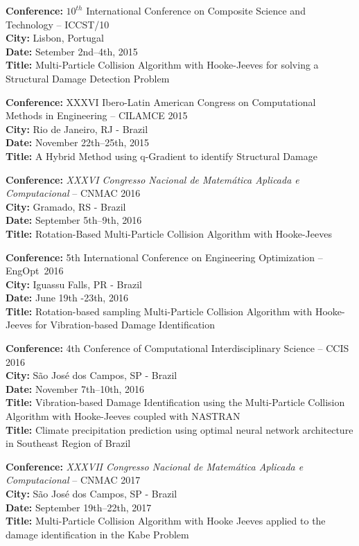 \textbf{Conference:} $10^{th}$ International Conference on Composite Science and Technology -- ICCST/10 \\
\textbf{City:} Lisbon, Portugal \\
\textbf{Date:} Setember 2nd--4th, 2015 \\
\textbf{Title:} Multi-Particle Collision Algorithm with Hooke-Jeeves for solving a Structural Damage Detection Problem

\textbf{Conference:}  XXXVI Ibero-Latin American Congress on Computational Methods in Engineering -- CILAMCE 2015 \\
\textbf{City:} Rio de Janeiro, RJ - Brazil \\
\textbf{Date:} November 22th--25th, 2015 \\
\textbf{Title:} A Hybrid Method using q-Gradient to identify Structural Damage

\textbf{Conference:} \textit{XXXVI Congresso Nacional de Matem\'atica Aplicada e Computacional} -- CNMAC 2016 \\
\textbf{City:} Gramado, RS - Brazil \\
\textbf{Date:} September 5th--9th, 2016 \\
\textbf{Title:} Rotation-Based Multi-Particle Collision Algorithm with Hooke-Jeeves

\textbf{Conference:} 5th International Conference on Engineering Optimization -- \mbox{EngOpt 2016} \\
\textbf{City:} Iguassu Falls, PR - Brazil \\
\textbf{Date:} June 19th -23th, 2016 \\
\textbf{Title:} Rotation-based sampling Multi-Particle Collision Algorithm with Hooke-Jeeves for Vibration-based Damage Identification

\textbf{Conference:} 4th Conference of Computational Interdisciplinary Science -- CCIS 2016 \\
\textbf{City:} São José dos Campos, SP - Brazil \\
\textbf{Date:} November 7th--10th, 2016 \\
\textbf{Title:} Vibration-based Damage Identification using the Multi-Particle Collision Algorithm with Hooke-Jeeves coupled with NASTRAN \\
\textbf{Title:} Climate precipitation prediction using optimal neural network architecture in Southeast Region of Brazil

\textbf{Conference:} \textit{XXXVII Congresso Nacional de Matem\'atica Aplicada e Computacional} -- CNMAC 2017 \\
\textbf{City:} São José dos Campos, SP - Brazil \\
\textbf{Date:} September 19th--22th, 2017 \\
\textbf{Title:} Multi-Particle Collision Algorithm with Hooke Jeeves applied to the damage identification in the Kabe Problem 

